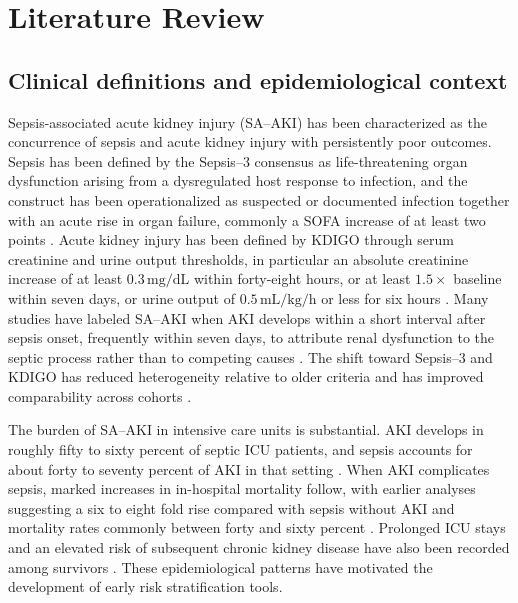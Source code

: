 \chapter{Literature Review}\label{chap:litreview}

\section{Clinical definitions and epidemiological context}
Sepsis-associated acute kidney injury (SA--AKI) has been characterized as the concurrence of sepsis and acute kidney injury with persistently poor outcomes. Sepsis has been defined by the Sepsis--3 consensus as life-threatening organ dysfunction arising from a dysregulated host response to infection, and the construct has been operationalized as suspected or documented infection together with an acute rise in organ failure, commonly a SOFA increase of at least two points \citep{Singer_2016}. Acute kidney injury has been defined by KDIGO through serum creatinine and urine output thresholds, in particular an absolute creatinine increase of at least $0.3\,\mathrm{mg/dL}$ within forty-eight hours, or at least $1.5\times$ baseline within seven days, or urine output of $0.5\,\mathrm{mL/kg/h}$ or less for six hours \citep{KDIGO_2012}. Many studies have labeled SA--AKI when AKI develops within a short interval after sepsis onset, frequently within seven days, to attribute renal dysfunction to the septic process rather than to competing causes \citep{Peerapornratana_2019,Poston_Koyner_2019}. The shift toward Sepsis--3 and KDIGO has reduced heterogeneity relative to older criteria and has improved comparability across cohorts \citep{Singer_2016,KDIGO_2012}.

The burden of SA--AKI in intensive care units is substantial. AKI develops in roughly fifty to sixty percent of septic ICU patients, and sepsis accounts for about forty to seventy percent of AKI in that setting \citep{Peerapornratana_2019,Poston_Koyner_2019}. When AKI complicates sepsis, marked increases in in-hospital mortality follow, with earlier analyses suggesting a six to eight fold rise compared with sepsis without AKI and mortality rates commonly between forty and sixty percent \citep{Poston_Koyner_2019,Peerapornratana_2019}. Prolonged ICU stays and an elevated risk of subsequent chronic kidney disease have also been recorded among survivors \citep{Poston_Koyner_2019,Peerapornratana_2019}. These epidemiological patterns have motivated the development of early risk stratification tools.

